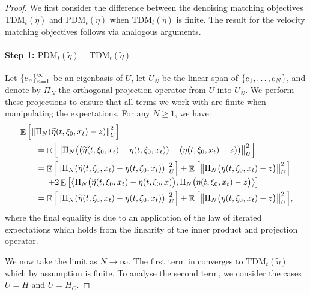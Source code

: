 \begin{proof}
  We first consider the difference between the denoising matching objectives \(\mathrm{TDM}_{t}(\widetilde{\eta})\) and \(\mathrm{PDM}_{t}(\widetilde{\eta})\) when \(\mathrm{TDM}_{t}(\widetilde{\eta})\) is finite. The result for the velocity matching objectives follows via analogous arguments.
  \paragraph{Step 1: \(\mathrm{PDM}_{t}(\widetilde{\eta}) - \mathrm{TDM}_{t}(\widetilde{\eta})\)}

  Let \(\qty{e_{n}}_{n=1}^{\infty}\) be an eigenbasis of \(U\), let \(U_{N}\) be the linear span of \(\qty{e_{1}, \ldots, e_{N}}\), and denote by \(\Pi_{N}\) the orthogonal projection operator from \(U\) into \(U_{N}\). We perform these projections to ensure that all terms we work with are finite when manipulating the expectations. For any \(N \geq 1\), we have:
  \begin{align}
    &\mathop{\mathbb{E}}\qty[ \norm{\Pi_{N}\qty(\widetilde{\eta}(t, \xi_{0}, x_{t}) - z)}_{U}^{2} ] \label{eqn:lhs}\\
    &\qquad= \mathop{\mathbb{E}}\qty[ \norm{\Pi_{N}\big(\qty(\widetilde{\eta}(t, \xi_{0}, x_{t}) - \eta(t, \xi_{0}, x_{t})) - (\eta(t, \xi_{0}, x_{t}) - z)\big)}_{U}^{2} ] \notag\\
    &\qquad= \mathop{\mathbb{E}}\qty[\norm{\Pi_{N}( \widetilde{\eta}(t, \xi_{0}, x_{t}) - \eta(t, \xi_{0}, x_{t}))}_{U}^{2}] + \mathop{\mathbb{E}}\qty[\norm{\Pi_{N} \big(\eta(t, \xi_{0}, x_{t}) - z\big)}_{U}^{2}]\notag\\[-0.25em]
    &\qquad\mathrel{\phantom{=}}\,+ 2 \mathop{\mathbb{E}}\qty[ \ev{ \Pi_{N}\big(\widetilde{\eta}(t, \xi_{0}, x_{t}) - \eta(t, \xi_{0}, x)\big), \Pi_{N} \big(\eta(t, \xi_{0}, x_{t}) - z\big)} ] \notag\\
    &\qquad= \mathop{\mathbb{E}}\qty[\norm{\Pi_{N}( \widetilde{\eta}(t, \xi_{0}, x_{t}) - \eta(t, \xi_{0}, x_{t}))}_{U}^{2}] + \mathop{\mathbb{E}}\qty[\norm{\Pi_{N} \big(\eta(t, \xi_{0}, x_{t}) - z\big)}_{U}^{2}], \label{eqn:lossn}
  \end{align}
  where the final equality is due to an application of the law of iterated expectations which holds from the linearity of the inner product and projection operator.

  We now take the limit as \(N \to \infty\). The first term in  converges to \(\mathrm{TDM}_{t}(\widetilde{\eta})\) which by assumption is finite. To analyse the second term, we consider the cases \(U = H\) and \(U = H_{C}\).


\end{proof}
